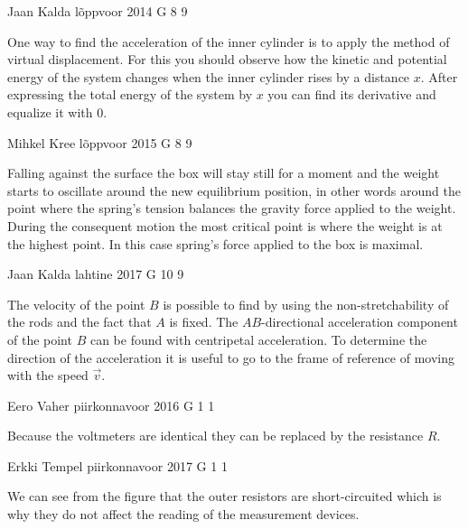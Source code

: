 \documentclass[11pt]{article}
\begin{document}
{Jaan Kalda} %
{lõppvoor} %
{2014} %
{G 8} %
{9} %
{

\ifEngHint
One way to find the acceleration of the inner cylinder is to apply the method of virtual displacement. For this you should observe how the kinetic and potential energy of the system changes when the inner cylinder rises by a distance $x$. After expressing the total energy of the system by $x$ you can find its derivative and equalize it with 0.
\fi
}

{Mihkel Kree} %
{lõppvoor} %
{2015} %
{G 8} %
{9} %
{

\ifEngHint
Falling against the surface the box will stay still for a moment and the weight starts to oscillate around the new equilibrium position, in other words around the point where the spring’s tension balances the gravity force applied to the weight. During the consequent motion the most critical point is where the weight is at the highest point. In this case spring’s force applied to the box is maximal.
\fi
}

{Jaan Kalda} %
{lahtine} %
{2017} %
{G 10} %
{9} %
{

\ifEngHint
The velocity of the point $B$ is possible to find by using the non-stretchability of the rods and the fact that $A$ is fixed. The $AB$-directional acceleration component of the point $B$ can be found with centripetal acceleration. To determine the direction of the acceleration it is useful to go to the frame of reference of moving with the speed $\vec{v}$.
\fi
}

{Eero Vaher} %
{piirkonnavoor} %
{2016} %
{G 1} %
{1} %
{

\ifEngHint
Because the voltmeters are identical they can be replaced by the resistance $R$.
\fi
}

{Erkki Tempel} %
{piirkonnavoor} %
{2017} %
{G 1} %
{1} %
{

\ifEngHint
We can see from the figure that the outer resistors are short-circuited which is why they do not affect the reading of the measurement devices.
\fi
}
\end{document}
